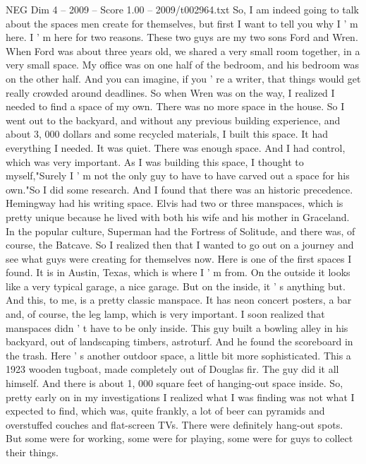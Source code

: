 \begin{textsample}{NEG Dim 4 – 2009 – Score 1.00 – 2009/t002964.txt}  \label{ex:f4_neg_038}
So, I am indeed going to talk about the spaces men create for themselves, but first I want to tell you why I ' m here.
I ' m here for two reasons.
These two guys are my two sons Ford and Wren.
When Ford was about three years old, we shared a very small room together, in a very small space.
My office was on one half of the bedroom, and his bedroom was on the other half.
And you can imagine, if you ' re a writer, that things would get really crowded around deadlines.
So when Wren was on the way, I realized I needed to find a space of my own.
There was no more space in the house.
So I went out to the backyard, and without any previous building experience, and about 3, 000 dollars and some recycled materials, I built this space.
It had everything I needed.
It was quiet.
There was enough space.
And I had control, which was very important.
As I was building this space, I thought to myself,"Surely I ' m not the only guy to have to have carved out a space for his own."So I did some research.
And I found that there was an historic precedence.
Hemingway had his writing space.
Elvis had two or three manspaces, which is pretty unique because he lived with both his wife and his mother in Graceland.
In the popular culture, Superman had the Fortress of Solitude, and there was, of course, the Batcave.
So I realized then that I wanted to go out on a journey and see what guys were creating for themselves now.
Here is one of the first spaces I found.
It is in Austin, Texas, which is where I ' m from.
On the outside it looks like a very typical garage, a nice garage.
But on the inside, it ' s anything but.
And this, to me, is a pretty classic manspace.
It has neon concert posters, a bar and, of course, the leg lamp, which is very important.
I soon realized that manspaces didn ' t have to be only inside.
This guy built a bowling alley in his backyard, out of landscaping timbers, astroturf.
And he found the scoreboard in the trash.
Here ' s another outdoor space, a little bit more sophisticated.
This a 1923 wooden tugboat, made completely out of Douglas fir.
The guy did it all himself.
And there is about 1, 000 square feet of hanging-out space inside.
So, pretty early on in my investigations I realized what I was finding was not what I expected to find, which was, quite frankly, a lot of beer can pyramids and overstuffed couches and flat-screen TVs.
There were definitely hang-out spots.
But some were for working, some were for playing, some were for guys to collect their things.

\end{textsample}
